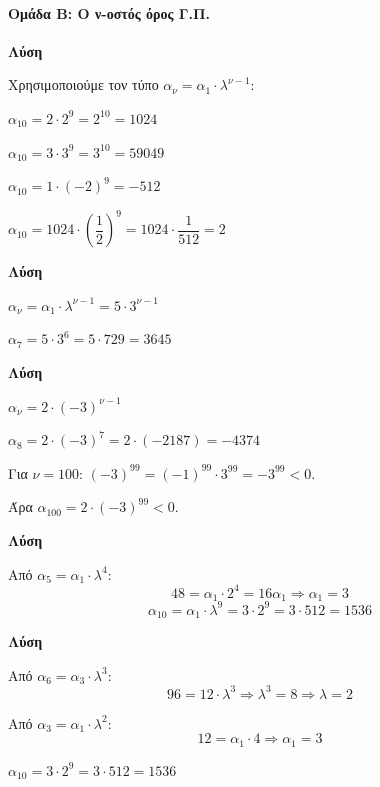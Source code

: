 \documentclass[11pt,a4paper,modern]{FFExercises}
\begin{document}
\paragraph{Ομάδα Β: Ο ν-οστός όρος Γ.Π.}

\askhsh
\textbf{Λύση}

Χρησιμοποιούμε τον τύπο $\alpha_\nu = \alpha_1 \cdot \lambda^{\nu-1}$:
\begin{alist}
  \item $\alpha_{10} = 2 \cdot 2^9 = 2^{10} = 1024$
  \item $\alpha_{10} = 3 \cdot 3^9 = 3^{10} = 59049$
  \item $\alpha_{10} = 1 \cdot (-2)^9 = -512$
  \item $\alpha_{10} = 1024 \cdot \left(\dfrac{1}{2}\right)^9 = 1024 \cdot \dfrac{1}{512} = 2$
\end{alist}

\askhsh
\textbf{Λύση}
\begin{alist}
  \item $\alpha_\nu = \alpha_1 \cdot \lambda^{\nu-1} = 5 \cdot 3^{\nu-1}$
  \item $\alpha_7 = 5 \cdot 3^6 = 5 \cdot 729 = 3645$
\end{alist}

\askhsh
\textbf{Λύση}
\begin{alist}
  \item $\alpha_\nu = 2 \cdot (-3)^{\nu-1}$
  \item $\alpha_8 = 2 \cdot (-3)^7 = 2 \cdot (-2187) = -4374$
  \item Για $\nu = 100$: $(-3)^{99} = (-1)^{99} \cdot 3^{99} = -3^{99} < 0$.
  
  Άρα $\alpha_{100} = 2 \cdot (-3)^{99} < 0$.
\end{alist}

\askhsh
\textbf{Λύση}

Από $\alpha_5 = \alpha_1 \cdot \lambda^4$:
\[
48 = \alpha_1 \cdot 2^4 = 16 \alpha_1 \Rightarrow \alpha_1 = 3
\]
\[
\alpha_{10} = \alpha_1 \cdot \lambda^9 = 3 \cdot 2^9 = 3 \cdot 512 = 1536
\]

\askhsh
\textbf{Λύση}
\begin{alist}
  \item Από $\alpha_6 = \alpha_3 \cdot \lambda^3$:
  \[
  96 = 12 \cdot \lambda^3 \Rightarrow \lambda^3 = 8 \Rightarrow \lambda = 2
  \]
  
  \item Από $\alpha_3 = \alpha_1 \cdot \lambda^2$:
  \[
  12 = \alpha_1 \cdot 4 \Rightarrow \alpha_1 = 3
  \]
  
  \item $\alpha_{10} = 3 \cdot 2^9 = 3 \cdot 512 = 1536$
\end{alist}
\end{document}
